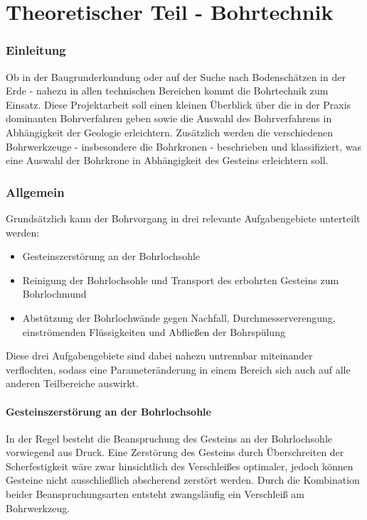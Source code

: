 \documentclass[12pt,a4paper,draft]{scrartcl} %
\begin{document}
\newpage

\tableofcontents
\newpage



\part{Theoretischer Teil - Bohrtechnik}\label{Bohrtechnik}



\section{Einleitung}
Ob in der Baugrunderkundung oder auf der Suche nach Bodenschätzen in der Erde - nahezu in allen technischen Bereichen kommt die Bohrtechnik zum Einsatz. Diese Projektarbeit soll einen kleinen Überblick über die in der Praxis dominanten Bohrverfahren geben sowie die Auswahl des Bohrverfahrens in Abhängigkeit der Geologie erleichtern. Zusätzlich werden die verschiedenen Bohrwerkzeuge - insbesondere die Bohrkronen - beschrieben und klassifiziert, was eine Auswahl der Bohrkrone in Abhängigkeit des Gesteins erleichtern soll.
\section{Allgemein}

Grundsätzlich kann der Bohrvorgang in drei relevante Aufgabengebiete unterteilt werden:

\begin{itemize}
\item Gesteinszerstörung an der Bohrlochsohle
\item Reinigung der Bohrlochsohle und Transport des erbohrten Gesteins zum Bohrlochmund
\item Abstützung der Bohrlochwände gegen Nachfall, Durchmesserverengung, einström\-enden Flüssigkeiten und Abfließen der Bohrspülung
\end{itemize}

Diese drei Aufgabengebiete sind dabei nahezu untrennbar miteinander verflochten, sodass eine Parameteränderung in einem Bereich sich auch auf alle anderen Teilbereiche auswirkt.\\

\subsection{Gesteinszerstörung an der Bohrlochsohle}
In der Regel besteht die Beanspruchung des Gesteins an der Bohrlochsohle vorwiegend aus Druck. Eine Zerstörung des Gesteins durch Überschreiten der Scherfestigkeit wäre zwar hinsichtlich des Verschleißes optimaler, jedoch können Gesteine nicht ausschließlich abscherend zerstört werden. Durch die Kombination beider Beanspruchungsarten entsteht zwangsläufig ein Verschleiß am Bohrwerkzeug.\\
\end{document}
